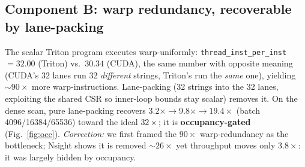 \documentclass[acmsmall,review,anonymous]{acmart}
\begin{document}
\subsection{Component B: warp redundancy, recoverable by lane-packing}
The scalar Triton program executes warp-uniformly: \texttt{thread\_inst\_per\_inst} $=32.00$ (Triton)
vs.\ $30.34$ (CUDA), the same number with opposite meaning (CUDA's 32 lanes run 32 \emph{different}
strings, Triton's run the \emph{same} one), yielding ${\sim}90\times$ more warp-instructions. Lane-packing
(32 strings into the 32 lanes, exploiting the shared CSR so inner-loop bounds stay scalar) removes it.
On the dense scan, pure lane-packing recovers $3.2\times \rightarrow 9.8\times \rightarrow 19.4\times$
(batch 4096/16384/65536) toward the ideal $32\times$; it is \textbf{occupancy-gated}
(Fig.~\ref{fig:occ}). \emph{Correction:} we first framed the $90\times$ warp-redundancy as the
bottleneck; Nsight shows it is removed ${\sim}26\times$ yet throughput moves only $3.8\times$: it was
largely hidden by occupancy.
\end{document}
